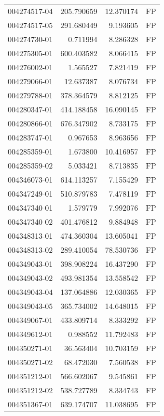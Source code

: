 \begin{tabular}{lrrl}
004274517-04 &  205.790659 &    12.370174 &   FP \\
004274517-05 &  291.680449 &     9.193605 &   FP \\
004274730-01 &    0.711994 &     8.286328 &   FP \\
004275305-01 &  600.403582 &     8.066415 &   FP \\
004276002-01 &    1.565527 &     7.821419 &   FP \\
004279066-01 &   12.637387 &     8.076734 &   FP \\
004279788-01 &  378.364579 &     8.812125 &   FP \\
004280347-01 &  414.188458 &    16.090145 &   FP \\
004280866-01 &  676.347902 &     8.733175 &   FP \\
004283747-01 &    0.967653 &     8.963656 &   FP \\
004285359-01 &    1.673800 &    10.416957 &   FP \\
004285359-02 &    5.033421 &     8.713835 &   FP \\
004346073-01 &  614.113257 &     7.155429 &   FP \\
004347249-01 &  510.879783 &     7.478119 &   FP \\
004347340-01 &    1.579779 &     7.992076 &   FP \\
004347340-02 &  401.476812 &     9.884948 &   FP \\
004348313-01 &  474.360304 &    13.605041 &   FP \\
004348313-02 &  289.410054 &    78.530736 &   FP \\
004349043-01 &  398.908224 &    16.437290 &   FP \\
004349043-02 &  493.981354 &    13.558542 &   FP \\
004349043-04 &  137.064886 &    12.030365 &   FP \\
004349043-05 &  365.734002 &    14.648015 &   FP \\
004349067-01 &  433.809714 &     8.333292 &   FP \\
004349612-01 &    0.988552 &    11.792483 &   FP \\
004350271-01 &   36.563404 &    10.703159 &   FP \\
004350271-02 &   68.472030 &     7.560538 &   FP \\
004351212-01 &  566.602067 &     9.545861 &   FP \\
004351212-02 &  538.727789 &     8.334743 &   FP \\
004351367-01 &  639.174707 &    11.038695 &   FP \\

\end{tabular}

